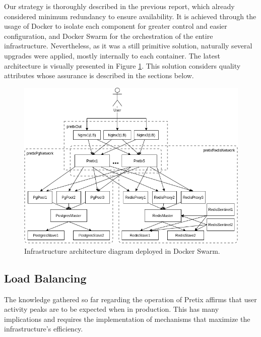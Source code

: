 \documentclass[12pt]{article}
\begin{document}
Our strategy is thoroughly described in the previous report, which already considered minimum redundancy to ensure availability.
It is achieved through the usage of Docker \cite{docker} to isolate each component for greater control and easier configuration, and Docker Swarm \cite{dockerswarm}
for the orchestration of the entire infrastructure.
Nevertheless, as it was a still primitive solution, naturally several upgrades were applied, mostly internally to each container.
The latest architecture is visually presented in Figure \ref{fig:InfrastructureArchitecture}.
This solution considers quality attributes whose assurance is described in the sections below.

\begin{figure}[H]
  \centering
  \begin{minipage}{.85\textwidth}
    \centering
    \includegraphics[width=\linewidth]{diagrams/InfrastructureArchitecture.png}
  \end{minipage}%
  \caption{Infrastructure architecture diagram deployed in Docker Swarm.}
  \label{fig:InfrastructureArchitecture}
\end{figure}

\subsection{Load Balancing} \label{architecture.loadbalancing} %


The knowledge gathered so far regarding the operation of Pretix affirms that user activity peaks are to be expected when in production.
This has many implications and requires the implementation of mechanisms that maximize the infrastructure's efficiency.
\end{document}
